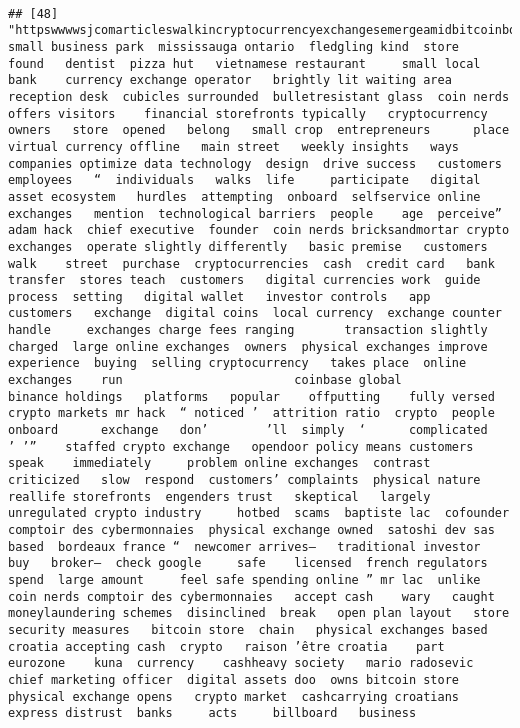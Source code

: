 \documentclass[
]{article}
\begin{document}
\begin{verbatim}
                                                                                                                                                                                                                                                                                                                                                                                                                                                                   
## [48] "httpswwwwsjcomarticleswalkincryptocurrencyexchangesemergeamidbitcoinboom   small business park  mississauga ontario  fledgling kind  store   found   dentist  pizza hut   vietnamese restaurant     small local bank    currency exchange operator   brightly lit waiting area  reception desk  cubicles surrounded  bulletresistant glass  coin nerds  offers visitors    financial storefronts typically   cryptocurrency  owners   store  opened   belong   small crop  entrepreneurs      place  virtual currency offline   main street   weekly insights   ways companies optimize data technology  design  drive success   customers  employees   “  individuals   walks  life     participate   digital asset ecosystem   hurdles  attempting  onboard  selfservice online exchanges   mention  technological barriers  people    age  perceive”  adam hack  chief executive  founder  coin nerds bricksandmortar crypto exchanges  operate slightly differently   basic premise   customers  walk    street  purchase  cryptocurrencies  cash  credit card   bank transfer  stores teach  customers   digital currencies work  guide    process  setting   digital wallet   investor controls   app   customers   exchange  digital coins  local currency  exchange counter  handle     exchanges charge fees ranging       transaction slightly    charged  large online exchanges  owners  physical exchanges improve  experience  buying  selling cryptocurrency   takes place  online exchanges    run                        coinbase global           binance holdings   platforms   popular    offputting    fully versed  crypto markets mr hack  “ noticed ’  attrition ratio  crypto  people  onboard      exchange   don’        ’ll  simply  ‘      complicated   ’ ’”    staffed crypto exchange   opendoor policy means customers  speak    immediately     problem online exchanges  contrast   criticized   slow  respond  customers’ complaints  physical nature  reallife storefronts  engenders trust   skeptical   largely unregulated crypto industry     hotbed  scams  baptiste lac  cofounder  comptoir des cybermonnaies  physical exchange owned  satoshi dev sas based  bordeaux france “  newcomer arrives—   traditional investor   buy   broker—  check google     safe    licensed  french regulators    spend  large amount     feel safe spending online ” mr lac  unlike coin nerds comptoir des cybermonnaies   accept cash    wary   caught   moneylaundering schemes  disinclined  break   open plan layout   store  security measures   bitcoin store  chain   physical exchanges based  croatia accepting cash  crypto   raison ’être croatia    part   eurozone    kuna  currency    cashheavy society   mario radosevic  chief marketing officer  digital assets doo  owns bitcoin store  physical exchange opens   crypto market  cashcarrying croatians    express distrust  banks     acts     billboard   business  
\end{verbatim}
\end{document}
